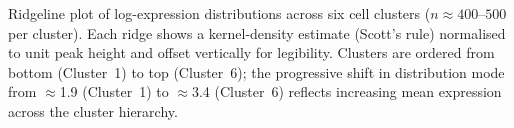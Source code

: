 \caption{Ridgeline plot of log-expression distributions across six cell clusters ($n \approx 400$--$500$ per cluster). Each ridge shows a kernel-density estimate (Scott's rule) normalised to unit peak height and offset vertically for legibility. Clusters are ordered from bottom (Cluster~1) to top (Cluster~6); the progressive shift in distribution mode from $\approx$1.9 (Cluster~1) to $\approx$3.4 (Cluster~6) reflects increasing mean expression across the cluster hierarchy.}

